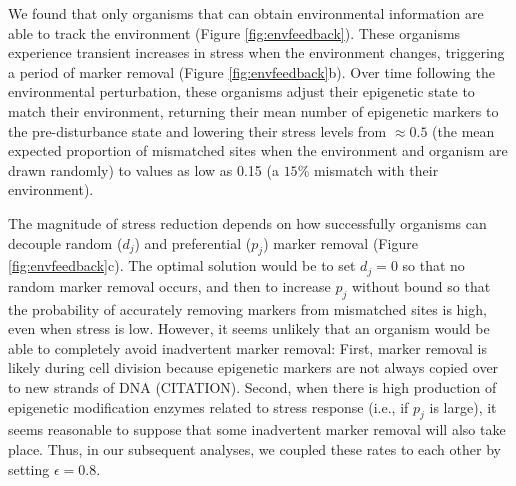 \documentclass{article}
\begin{document}
We found that %
only organisms that can obtain environmental information are able to track the environment (Figure \ref{fig:envfeedback}). These organisms experience transient increases in stress when the environment changes, triggering a period of marker removal (Figure \ref{fig:envfeedback}b). Over time following the environmental perturbation, these organisms adjust their epigenetic state to match their environment, returning their mean number of epigenetic markers to the pre-disturbance state and lowering their stress levels from $\approx 0.5$ (the mean expected proportion of mismatched sites when the environment and organism are drawn randomly) to values as low as 0.15 (a $15\%$ mismatch with their environment). 

The magnitude of stress reduction depends on how successfully organisms can decouple random ($d_j$) and preferential ($p_j$) marker removal (Figure \ref{fig:envfeedback}c). The optimal solution would be to set $d_j = 0$ so that no random marker removal occurs, and then to increase $p_j$ without bound so that the probability of accurately removing markers from mismatched sites is high, even when stress is low. However, it seems unlikely that an organism would be able to completely avoid inadvertent marker removal: First, marker removal is likely during cell division because epigenetic markers are not always copied over to new strands of DNA (CITATION). Second, when there is high production of epigenetic modification enzymes related to stress response (i.e., if $p_j$ is large), it seems reasonable to suppose that some inadvertent marker removal will also take place. Thus, in our subsequent analyses, we coupled these rates to each other by setting $\epsilon = 0.8$. %
\end{document}
